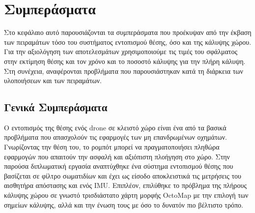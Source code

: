 \chapter{Συμπεράσματα}
\label{chapter:conclusions}

Στο κεφάλαιο αυτό παρουσιάζονται τα συμπεράσματα που προέκυψαν από την έκβαση των πειραμάτων τόσο του συστήματος εντοπισμού θέσης, όσο και της κάλυψης χώρου. Για την αξιολόγηση των αποτελεσμάτων χρησιμοποιούμε τις τιμές του σφάλματος στην εκτίμηση θέσης και τον χρόνο και το ποσοστό κάλυψης για την πλήρη κάλυψη. Στη συνέχεια, αναφέρονται προβλήματα που παρουσιάστηκαν κατά τη διάρκεια των υλοποιήσεων και των πειραμάτων.

\section{Γενικά Συμπεράσματα}
Ο εντοπισμός της θέσης ενός drone σε κλειστό χώρο είναι ένα από τα βασικά προβλήματα που απασχολούν τις εφαρμογές των μη επανδρωμένων οχημάτων. Γνωρίζοντας την θέση του, το ρομπότ μπορεί να πραγματοποιήσει πληθώρα εφαρμογών που απαιτούν την ασφαλή και αξιόπιστη πλοήγηση στο χώρο. Στην παρούσα διπλωματική εργασία αναπτύχθηκε ένα σύστημα εντοπισμού θέσης που βασίζεται σε φίλτρο σωματιδίων και έχει ως είσοδο αποκλειστικά τις μετρήσεις του αισθητήρα απόστασης και ενός IMU. Επιπλέον, επιλύθηκε το πρόβλημα της πλήρους κάλυψης χώρου σε γνωστό τρισδιάστατο χάρτη μορφής OctoMap με την επιλογή των σημείων κάλυψης, αλλά και την ένωση τους με όσο το δυνατόν πιο βέλτιστο τρόπο.

